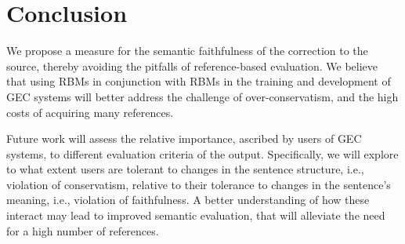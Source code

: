 \documentclass[a4paper, 11pt]{article}
\begin{document}
%
%
%
\section{Conclusion}

We propose a measure for the semantic faithfulness of the correction to the source,
thereby avoiding the pitfalls of reference-based evaluation. We believe that using RBMs in conjunction with RBMs in the training and development of GEC
systems will better address the challenge of over-conservatism, and the 
high costs of acquiring many references.

Future work will assess the relative importance, ascribed by users of GEC systems,
to different evaluation criteria of the output.
Specifically, we will explore to what extent users are
tolerant to changes in the sentence structure, i.e.,
violation of conservatism, relative to their tolerance to changes 
in the sentence's meaning, i.e., violation of faithfulness.
A better understanding of how these interact
may lead to improved semantic evaluation, that will alleviate the need
for a high number of references.




\end{document}

